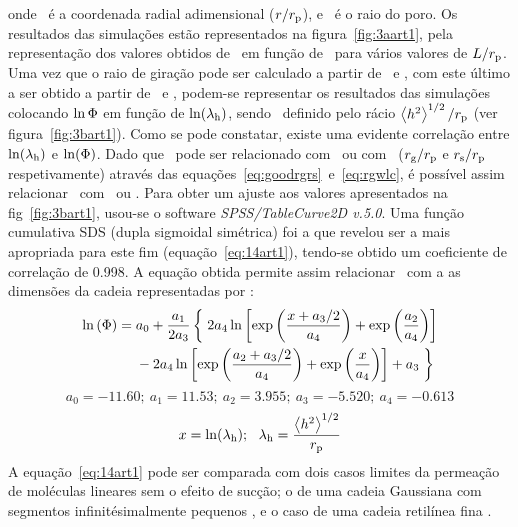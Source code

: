 onde \radialadimensional\ é a coordenada radial adimensional ($r/r_{\mathrm{p}}$), e \raioporo\ é o raio do poro. Os resultados das simulações estão representados na figura~\ref{fig:3aart1}, pela representação dos valores obtidos de \particao\ em função de \numsegmento\ para vários valores de $L/r_{\mathrm{p}}$. Uma vez que o raio de giração pode ser calculado a partir de \numsegmento\ e \comsegmento, com este último a ser obtido a partir de \contorno\ e \numsegmento, podem-se representar os resultados das simulações colocando $\ln \Phi$ em função de $\ln (\lambda_{\mathrm{h}})$, sendo \lambdah\ definido pelo rácio $\left\langle h^{2}\right\rangle^{1/2}/r_{\mathrm{p}}$ (ver figura~\ref{fig:3bart1}). Como se pode constatar, existe uma evidente correlação entre $\ln (\lambda_{\mathrm{h}})$ e $\ln (\Phi)$. Dado que \lambdah\ pode ser relacionado com \lambdag\ ou com \lambdas\ ($r_{\mathrm{g}}/r_{\mathrm{p}}$ e $r_{\mathrm{s}}/r_{\mathrm{p}}$ respetivamente) através das equações~\ref{eq:goodrgrs}~e~\ref{eq:rgwlc}, é possível assim relacionar \particao\ com \lambdag\ ou \lambdas. Para obter um ajuste aos valores apresentados na fig~\ref{fig:3bart1}, usou-se o software \emph{SPSS/TableCurve2D v.5.0}. Uma função cumulativa SDS (dupla sigmoidal simétrica) foi a que revelou ser a mais apropriada para este fim (equação~\ref{eq:14art1}), tendo-se obtido um coeficiente de correlação de 0.998. A equação obtida permite assim relacionar \particao\ com a as dimensões da cadeia representadas por \distanciah:
% 
\begin{equation}
\label{eq:14art1}
\begin{split}
\ln \left(\particao\right)= {} & a_{0}+\frac{a_{1}}{2a_{3}}\left\{\vphantom{\frac{x+a_{3}/2}{a_{4}}}\right.2a_{4}\ln \left[\exp \left(\frac{x+a_{3}/2}{a_{4}}\right)+\exp \left(\frac{a_{2}}{a_{4}}\right)\right] \\
 & -2a_{4}\ln \left[\exp\left(\frac{a_{2}+a_{3}/2}{a_{4}}\right)+\exp \left(\frac{x}{a_{4}}\right)\right]+a_{3}\left.\vphantom{\frac{x+a_{3}/2}{a_{4}}}\right\}
\end{split}
\end{equation}
\begin{displaymath}
a_{0}=-11.60;\ a_{1}=11.53;\ a_{2}=3.955;\ a_{3}=-5.520;\ a_{4}=-0.613
\end{displaymath}
\begin{displaymath}
x=\ln (\lambdah);\ \ \lambdah=\frac{\distanciah}{\raioporo}
\end{displaymath}
A equação~\ref{eq:14art1} pode ser comparada com dois casos limites da permeação de moléculas lineares sem o efeito de sucção; o de uma cadeia Gaussiana com segmentos infinitésimalmente pequenos \cite{casassa}, e o caso de uma cadeia retilínea fina \cite{giddings}.
